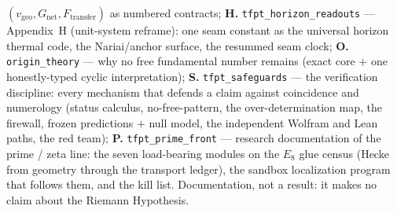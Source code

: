 \begin{navbox}
$(v_{\mathrm{geo}}, G_{\mathrm{net}}, F_{\mathrm{transfer}})$ as numbered contracts;
\textbf{H.} \texttt{tfpt\_horizon\_readouts} --- Appendix~H (unit-system reframe): one seam constant as
the universal horizon thermal code, the Nariai/anchor surface, the resummed seam clock;
\textbf{O.} \texttt{origin\_theory} --- why no free fundamental number remains (exact core $+$ one
honestly-typed cyclic interpretation);
\textbf{S.} \texttt{tfpt\_safeguards} --- the verification discipline: every mechanism that defends a claim
against coincidence and numerology (status calculus, no-free-pattern, the over-determination map, the
firewall, frozen predictions $+$ null model, the independent Wolfram and Lean paths, the red team);
\textbf{P.} \texttt{tfpt\_prime\_front} --- research documentation of the prime / zeta line: the seven
load-bearing modules on the $E_8$ glue census (Hecke from geometry through the transport ledger), the
sandbox localization program that follows them, and the kill list. Documentation, not a result: it makes
no claim about the Riemann Hypothesis.
\end{navbox}
